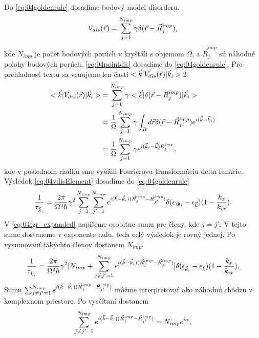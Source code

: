 Do \eqref{eq:04goldenrule} dosadíme bodový model disorderu.
\begin{align}
\label{eq:04pointdis}
V_{dis}(\vec{r})=\sum_{j=1}^{N_{imp}}\gamma \delta(\vec{r}-\vec R_j^{imp})\text{,}
\end{align}
kde $N_{imp}$ je počet bodových porúch v kryštáli s objemom $\Omega$, a $\vec R^{imp}_j$ sú náhodné polohy bodových porúch. 
\eqref{eq:04pointdis} dosadíme do \eqref{eq:04goldenrule}. Pre prehľadnosť textu sa venujeme len časti $<\vec{k}|V_{dis}(\vec{r})|\vec{k}_i>2$
\begin{align}
\label{eq:04vdisElement}
\notag
<\vec{k}|V_{dis}(\vec{r})|\vec{k}_i>&=\sum_{j=1}^{N_{imp}}\gamma<\vec{k}|\delta(\vec{r}-\vec R^{imp}_j)|\vec{k}_i>\\
\notag
&=\frac{1}{\Omega}\sum_{j=1}^{N_{imp}}\gamma\int_{\Omega}d\vec{r}\delta(\vec{r} -\vec R_j^{imp})e^{i(\vec{k}-\vec{k}_i)}\\
&=\frac{1}{\Omega}\sum_{j=1}^{N_{imp}}\gamma e^{i(\vec{k}_i-\vec{k})R_j^{imp}} \text{,}
\end{align}
kde v poslednom riadku sme využili Fourierovu transformáciu delta funkcie. Výsledok \eqref{eq:04vdisElement} dosadíme do \eqref{eq:04goldenrule}
\begin{align}
\label{eq:04fgr_expanded}
\frac{1}{\tau_{\vk_i}} = \frac{2\pi}{\Omega^2\hbar}\gamma^2\sum_{j=1}^{N_{imp}}\sum_{j'=1}^{N_{imp}}e^{i(\vk-\vk_i)(\vec R^{imp}_j-\vec R^{imp}_{j'})}\delta(\epsilon_{\k_i}-\epsilon_{\vk})(1-\frac{k_x}{k_{ix}}) \text{.}
\end{align}
V \eqref{eq:04fgr_expanded} napíšeme osobitne sumu pre členy, kde $j=j'$. V tejto sume dostaneme v exponente nulu, teda celý výsledok je rovný jednej. Po vysumovaní takýchto členov dostanem $N_{imp}$.
\begin{align}
\label{eq:04fgr_expanded2}
\frac{1}{\tau_{\vec{k}_i}} = \frac{2\pi}{\Omega^2\hbar}\gamma^2[N_{imp}+\sum_{j\neq j'=1}^{N_{imp}}e^{i(\vec{k}-\vec{k}_i)(\vec R^{imp}_j-\vec R^{imp}_{j'})}]\delta(\epsilon_{\vec{k}_i}-\epsilon_{\vec{k}})(1-\frac{k_x}{k_{ix}}) \text{.}
\end{align}
Sumu $\sum_{j\neq j'=1}^{N_{imp}}e^{i(\vec{k}-\vec{k}_i)(\vec R^{imp}_j-\vec R^{imp}_{j'})}$ môžme interpretovať ako náhodnú chôdzu v komplexnom priestore. Po vysčítaní dostanem
\begin{align}
\sum_{j\neq j'=1}^{N_{imp}}e^{i(\vec{k}-\vec{k}_i)(\vec R^{imp}_j-\vec R^{imp}_{j'})} =N_{imp}e^{i\alpha}\text{,}
\end{align}
